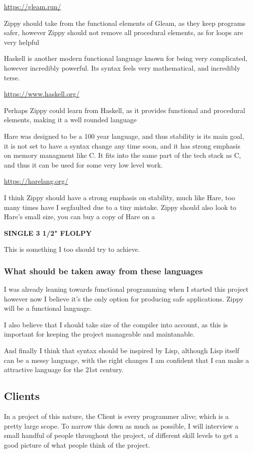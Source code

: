 \documentclass[a4paper,12pt]{article}
\begin{document}
{\begin{description}
		\url{https://gleam.run/}

		Zippy should take from the functional elements of Gleam, as they keep 
		programs safer, however Zippy should not remove all procedural 
		elements, as for loops are very helpful
	\item[Haskell] 
		Haskell is another modern functional language known for being
		very complicated, however incredibly powerful. Its syntax feels very 
		mathematical, and incredibly terse.

		\url{https://www.haskell.org/}

		Perhaps Zippy could learn from Haskell, as it provides functional and
		procedural elements, making it a well rounded language
	\item[Hare] 
		Hare was designed to be a 100 year language, and thus stability is 
		its main goal, it is not set to
		have a syntax change any time soon, and it has strong emphasis on 
		memory managment like C. It fits into the same part of the tech stack 
		as C, and thus it can be used for some very low level work.

		\url{https://harelang.org/}

		I think Zippy should have a strong emphasis on stability, much like Hare,
		too many times have I segfaulted due to a tiny mistake. Zippy should 
		also look to Hare's small size, you can buy a copy of Hare on a

		\textbf{SINGLE 3 1/2" FLOLPY}

		This is something I too should try to achieve.
\end{description}
\subsubsection{What should be taken away from these languages}
I was already leaning towards functional programming when I started this project however 
now I believe it's the only option for producing safe applications. Zippy will be
a functional language.

I also believe that I should take size of the compiler into account, as this is important 
for keeping the project manageable and maintanable.

And finally I think that syntax should be inspired by Lisp, although Lisp itself can be 
a messy language, with the right changes I am confident that I can make a attractive
language for the 21st century.

\subsection{Clients}
In a project of this nature, the Client is every programmer alive; which is a pretty 
large scope. To narrow this down as much as possible, I will interview a small handful
of people throughout the project, of different skill levels to get a good picture of
what people think of the project.
}
\end{document}
